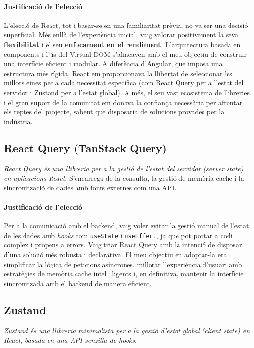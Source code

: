\paragraph{Justificació de l'elecció}
L'elecció de React, tot i basar-se en una familiaritat prèvia, no va ser una decisió superficial. Més enllà de l'experiència inicial, vaig valorar positivament la seva \textbf{flexibilitat} i el seu \textbf{enfocament en el rendiment}. L'arquitectura basada en components i l'ús del Virtual DOM s'alineaven amb el meu objectiu de construir una interfície eficient i modular. A diferència d'Angular, que imposa una estructura més rígida, React em proporcionava la llibertat de seleccionar les millors eines per a cada necessitat específica (com React Query per a l'estat del servidor i Zustand per a l'estat global). A més, el seu vast ecosistema de llibreries i el gran suport de la comunitat em donava la confiança necessària per afrontar els reptes del projecte, sabent que disposaria de solucions provades per la indústria.

\subsection{React Query (TanStack Query)}
\textit{React Query és una llibreria per a la gestió de l'estat del servidor (server state) en aplicacions React}. S'encarrega de la consulta, la gestió de memòria cache i la sincronització de dades amb fonts externes com una API.

\paragraph{Justificació de l'elecció}
Per a la comunicació amb el backend, vaig voler evitar la gestió manual de l'estat de les dades amb \textit{hooks} com \texttt{useState} i \texttt{useEffect}, ja que pot portar a codi complex i propens a errors. Vaig triar React Query amb la intenció de disposar d'una solució més robusta i declarativa. El meu objectiu en adoptar-la era simplificar la lògica de peticions asíncrones, millorar l'experiència d'usuari amb estratègies de memòria cache intel·ligents i, en definitiva, mantenir la interfície sincronitzada amb el backend de manera eficient.

\subsection{Zustand}
\textit{Zustand és una llibreria minimalista per a la gestió d'estat global (client state) en React, basada en una API senzilla de hooks}.

